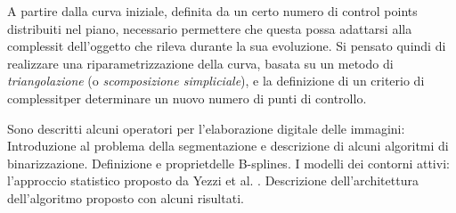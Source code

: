 A partire dalla curva iniziale, definita da un certo numero di control points distribuiti
nel piano, \e necessario permettere che questa possa adattarsi alla complessit\a 
dell'oggetto che rileva durante la sua evoluzione.
Si \e pensato quindi di realizzare una riparametrizzazione della curva, basata su un
metodo di {\it triangolazione} (o {\it scomposizione simpliciale}), e la definizione
di un criterio di complessit\a per determinare un nuovo numero di punti di controllo.
 


\begin{description}
\im[\sl Capitolo 2.] Sono descritti alcuni operatori per l'elaborazione digitale delle
   immagini:
   \bi
   \ei	
\im[\sl Capitolo 3.] Introduzione al problema della segmentazione e descrizione di alcuni
   algoritmi di binarizzazione.
\im[\sl Capitolo 4.] Definizione e propriet\a delle B-splines.
\im[\sl Capitolo 5.] I modelli dei contorni attivi: l'approccio statistico proposto da
   Yezzi et al. \cite{Yezzi}.
\im[\sl Capitolo 6.] Descrizione dell'architettura dell'algoritmo proposto con alcuni
   risultati.
\end{description}

\finepar